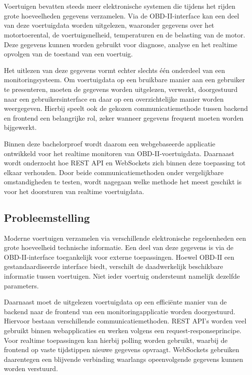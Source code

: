 \chapter{}%
\label{ch:inleiding}

Voertuigen bevatten steeds meer elektronische systemen die tijdens het rijden
grote hoeveelheden gegevens verzamelen. Via de OBD-II-interface kan een deel
van deze voertuigdata worden uitgelezen, waaronder gegevens over het motortoerental, 
de voertuigsnelheid, temperaturen en de belasting van de motor. 
Deze gegevens kunnen worden gebruikt voor diagnose, analyse en het
realtime opvolgen van de toestand van een voertuig.

Het uitlezen van deze gegevens vormt echter slechts één onderdeel van een
monitoringsysteem. Om voertuigdata op een bruikbare manier aan een gebruiker
te presenteren, moeten de gegevens worden uitgelezen, verwerkt, doorgestuurd
naar een gebruikersinterface en daar op een overzichtelijke manier worden
weergegeven. Hierbij speelt ook de gekozen communicatiemethode tussen backend
en frontend een belangrijke rol, zeker wanneer gegevens frequent moeten worden
bijgewerkt.

Binnen deze bachelorproef wordt daarom een webgebaseerde applicatie ontwikkeld
voor het realtime monitoren van OBD-II-voertuigdata. Daarnaast wordt onderzocht
hoe REST API en WebSockets zich binnen deze toepassing tot elkaar verhouden.
Door beide communicatiemethoden onder vergelijkbare omstandigheden te testen,
wordt nagegaan welke methode het meest geschikt is voor het doorsturen van
realtime voertuigdata.


\section{Probleemstelling}

Moderne voertuigen verzamelen via verschillende elektronische regeleenheden
een grote hoeveelheid technische informatie. Een deel van deze gegevens is via
de OBD-II-interface toegankelijk voor externe toepassingen. Hoewel OBD-II een
gestandaardiseerde interface biedt, verschilt de daadwerkelijk beschikbare
informatie tussen voertuigen. Niet ieder voertuig ondersteunt namelijk dezelfde
parameters.

Daarnaast moet de uitgelezen voertuigdata op een efficiënte manier van de
backend naar de frontend van een monitoringapplicatie worden doorgestuurd.
Hiervoor bestaan verschillende communicatiemethoden. REST API's worden veel
gebruikt binnen webapplicaties en werken volgens een request-responseprincipe.
Voor realtime toepassingen kan hierbij polling worden gebruikt, waarbij de
frontend op vaste tijdstippen nieuwe gegevens opvraagt. WebSockets gebruiken
daarentegen een blijvende verbinding waarlangs opeenvolgende gegevens kunnen
worden verstuurd.

